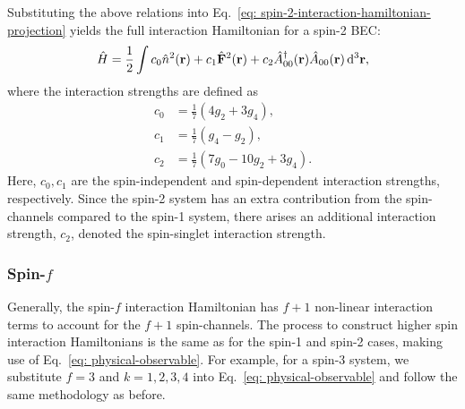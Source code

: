 Substituting the above relations into
Eq.~\eqref{eq: spin-2-interaction-hamiltonian-projection} yields the full
interaction Hamiltonian for a spin-2 BEC\@:
\begin{align}\label{eq: spin-2-interaction-hamiltonian}
    \hat{H} = \frac{1}{2}\int c_0\hat{n}^2(\vb{r}) + c_1\hat{\vb{F}}^2(\vb{r})
    + c_2\hat{A}^\dagger_{00}(\vb{r})\hat{A}_{00}(\vb{r}) \, \dd^3\vb{r},
\end{align}
where the interaction strengths are defined as
\begin{align}
    c_0 &=\frac{1}{7}\left(4g_2 + 3g_4\right), \\
    c_1 &=\frac{1}{7}\left(g_4 - g_2\right), \\
    c_2 &=\frac{1}{7}\left(7g_0 - 10g_2 + 3g_4\right).
\end{align}
Here, \(c_0, c_1\) are the spin-independent and spin-dependent interaction
strengths, respectively.
Since the spin-2 system has an extra contribution from the spin-channels
compared to the spin-1 system, there arises an additional interaction strength,
\(c_2\), denoted the spin-singlet interaction strength.

\subsubsection{Spin-\(f\)}
Generally, the spin-\(f\) interaction Hamiltonian has \(f + 1\) non-linear
interaction terms to account for the \(f + 1\) spin-channels.
The process to construct higher spin interaction Hamiltonians is the same as for
the spin-1 and spin-2 cases, making use of Eq.~\eqref{eq: physical-observable}.
For example, for a spin-3 system, we substitute \(f=3\) and \(k=1,2,3,4\) into
Eq.~\eqref{eq: physical-observable} and follow the same methodology as before.

